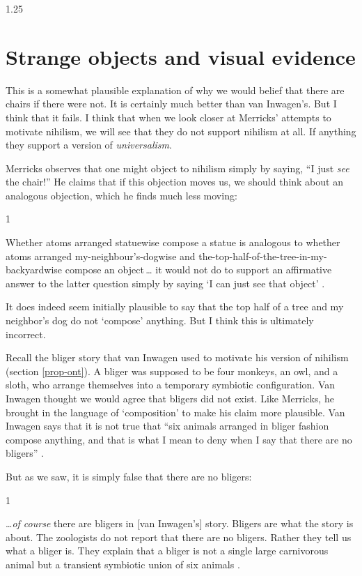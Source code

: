 \documentclass[11pt]{article}
\newenvironment{squote}{%
\begin{spacing}{1}
       	\begin{list}{}{%
\setlength{\labelwidth}{0pt}%
\rightmargin\leftmargin%
}
\item\relax
}{%
\end{list}%
\end{spacing}
}
\begin{document}
\begin{spacing}{1.25}
\section{Strange objects and visual evidence}
\label{dogbush}
This is a somewhat plausible explanation of why we would belief that
there are chairs if there were not.  It is certainly much better than
van Inwagen's.  But I think that it fails.  I think that when we look
closer at Merricks' attempts to motivate nihilism, we will see that
they do not support nihilism at all.  If anything they support a
version of {\em universalism}.

Merricks observes that one might object to nihilism simply by saying,
``I just {\em see} the chair!''  He claims that if this objection
moves us, we should think about an analogous objection, which he finds
much less moving:

\begin{squote}
Whether atoms arranged statuewise compose a statue is analogous to
whether atoms arranged my-neighbour's-dogwise and
the-top-half-of-the-tree-in-my-backyardwise compose an object\,\ldots
it would not do to support an affirmative answer to the latter
question simply by saying `I can just see that object'
\citeyearpar[73]{merricks2001a}.
\end{squote}

It does indeed seem initially plausible to say that the top half of a
tree and my neighbor's dog do not `compose' anything.  But I think
this is ultimately incorrect.

Recall the bliger story that van Inwagen used to motivate his version
of nihilism (section \ref{prop-ont}).  A bliger was supposed to be
four monkeys, an owl, and a sloth, who arrange themselves into a
temporary symbiotic configuration.  Van Inwagen thought we would agree
that bligers did not exist.  Like Merricks, he brought in the language
of `composition' to make his claim more plausible.  Van Inwagen says
that it is not true that ``six animals arranged in bliger fashion
compose anything, and that is what I mean to deny when I say that
there are no bligers'' \citeyearpar[104]{inwagen1995}.

But as we saw, it is simply false that there are no bligers:

\begin{squote}
\ldots {\em of course} there are bligers in [van Inwagen's] story.
Bligers are what the story is about.  The zoologists do not report
that there are no bligers.  Rather they tell us what a bliger is.
They explain that a bliger is not a single large carnivorous animal
but a transient symbiotic union of six animals
\citep[704]{rosenberg1993}.
\end{squote}


\end{spacing}
\end{document}
